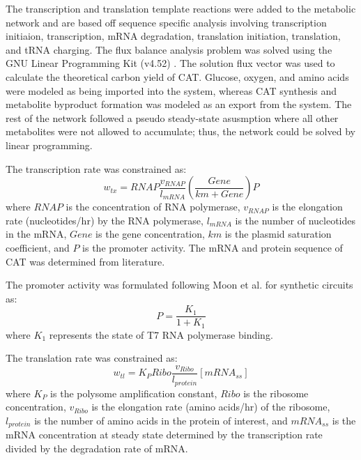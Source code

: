 \documentclass[12pt]{article}
\begin{document}
The transcription and translation template reactions were added to the metabolic network and are based off sequence specific analysis \cite{2002_allen_palsson} involving transcription initiaion, transcription, mRNA degradation, translation initiation, translation, and tRNA charging. 
The flux balance analysis problem was solved using the GNU Linear Programming Kit (v4.52) \cite{GLPK}.
The solution flux vector was used to calculate the theoretical carbon yield of CAT.
Glucose, oxygen, and amino acids were modeled as being imported into the system, whereas CAT synthesis and metabolite byproduct formation was modeled as an export from the system.
The rest of the network followed a pseudo steady-state asusmption where all other metabolites were not allowed to accumulate; thus, the network could be solved by linear programming.

The transcription rate was constrained as:
\begin{equation}\nonumber
	w_{tx} = RNAP\frac{v_{RNAP}}{l_{mRNA}}\left(\frac{Gene}{km+Gene}\right)P
\end{equation}
where $RNAP$ is the concentration of RNA polymerase, $v_{RNAP}$ is the elongation rate (nucleotides/hr) by the RNA polymerase, $l_{mRNA}$ is the number of nucleotides in the mRNA, $Gene$ is the gene concentration, $km$ is the plasmid saturation coefficient, and $P$ is the promoter activity.
The mRNA and protein sequence of CAT was determined from literature.

The promoter activity was formulated following Moon et al. for synthetic circuits as:
\begin{equation}\nonumber
	P = \frac{K_{1}}{1 + K_{1}}
\end{equation}
where $K_{1}$ represents the state of T7 RNA polymerase binding. 

The translation rate was constrained as:
 \begin{equation}\nonumber
	w_{tl} = K_{P}Ribo\frac{v_{Ribo}}{l_{protein}}[mRNA_{ss}]
\end{equation}
where $K_{P}$ is the polysome amplification constant, $Ribo$ is the ribosome concentration,  $v_{Ribo}$ is the elongation rate (amino acids/hr) of the ribosome, $l_{protein}$ is the number of amino acids in the protein of interest, and $mRNA_{ss}$ is the mRNA concentration at steady state determined by the transcription rate divided by the degradation rate of mRNA.  
\end{document}
